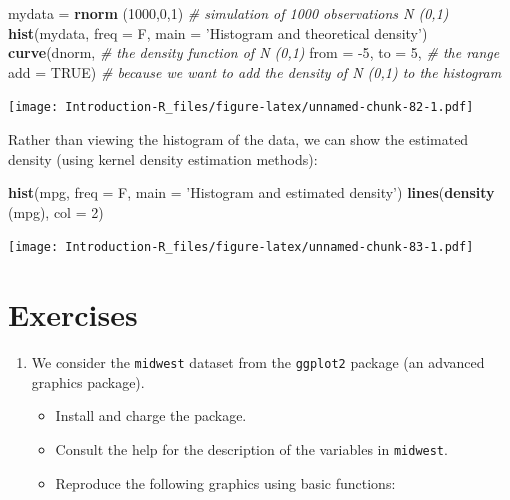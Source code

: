\documentclass[]{book}
\newenvironment{Shaded}{\begin{snugshade}}{\end{snugshade}}
\newcommand{\CommentTok}[1]{\textcolor[rgb]{0.56,0.35,0.01}{\textit{#1}}}
\newcommand{\DataTypeTok}[1]{\textcolor[rgb]{0.13,0.29,0.53}{#1}}
\newcommand{\DecValTok}[1]{\textcolor[rgb]{0.00,0.00,0.81}{#1}}
\newcommand{\KeywordTok}[1]{\textcolor[rgb]{0.13,0.29,0.53}{\textbf{#1}}}
\newcommand{\NormalTok}[1]{#1}
\newcommand{\OtherTok}[1]{\textcolor[rgb]{0.56,0.35,0.01}{#1}}
\newcommand{\StringTok}[1]{\textcolor[rgb]{0.31,0.60,0.02}{#1}}
\providecommand{\tightlist}{%
  \setlength{\itemsep}{0pt}\setlength{\parskip}{0pt}}
\begin{document}
\begin{Shaded}
\begin{Highlighting}[]
\NormalTok{mydata =}\StringTok{ }\KeywordTok{rnorm}\NormalTok{ (}\DecValTok{1000}\NormalTok{,}\DecValTok{0}\NormalTok{,}\DecValTok{1}\NormalTok{) }\CommentTok{# simulation of 1000 observations N (0,1)}
\KeywordTok{hist}\NormalTok{(mydata, }\DataTypeTok{freq =}\NormalTok{ F, }\DataTypeTok{main =} \StringTok{'Histogram and theoretical density'}\NormalTok{)}
\KeywordTok{curve}\NormalTok{(dnorm, }\CommentTok{# the density function of N (0,1)}
      \DataTypeTok{from =} \DecValTok{-5}\NormalTok{, }\DataTypeTok{to =} \DecValTok{5}\NormalTok{, }\CommentTok{# the range}
      \DataTypeTok{add =} \OtherTok{TRUE}\NormalTok{) }\CommentTok{# because we want to add the density of N (0,1) to the histogram}
\end{Highlighting}
\end{Shaded}

\texttt{[image: Introduction-R\_files/figure-latex/unnamed-chunk-82-1.pdf]}

Rather than viewing the histogram of the data, we can show the estimated density (using kernel density estimation methods):

\begin{Shaded}
\begin{Highlighting}[]
\KeywordTok{hist}\NormalTok{(mpg, }\DataTypeTok{freq =}\NormalTok{ F, }\DataTypeTok{main =} \StringTok{'Histogram and estimated density'}\NormalTok{)}
\KeywordTok{lines}\NormalTok{(}\KeywordTok{density}\NormalTok{ (mpg), }\DataTypeTok{col =} \DecValTok{2}\NormalTok{)}
\end{Highlighting}
\end{Shaded}

\texttt{[image: Introduction-R\_files/figure-latex/unnamed-chunk-83-1.pdf]}

\hypertarget{exercises}{%
\section{Exercises}\label{exercises}}

\begin{enumerate}
\def\labelenumi{\arabic{enumi}.}
\tightlist
\item
  We consider the \texttt{midwest} dataset from the \texttt{ggplot2} package (an advanced graphics package).

  \begin{itemize}
  \tightlist
  \item
    Install and charge the package.
  \item
    Consult the help for the description of the variables in \texttt{midwest}.
  \item
    Reproduce the following graphics using basic functions:
  \end{itemize}
\end{enumerate}
\end{document}
